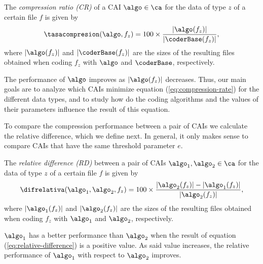 \vspace{+2pt}
\begin{defcion}
The \textit{compression ratio (CR)} of a CAI $\algo \in \ca$ for the data of type $z$ of a certain file $f$ is given by
\vspace{-5pt}
\begin{equation}
\label{eq:compression-rate}
\tasacompresion(\algo, f_z) = 100\times\frac{|\algo(f_z)|}{|\coderBase(f_z)|},
\end{equation}
where $|\algo(f_z)|$ and $|\coderBase(f_z)|$ are the sizes of the resulting files obtained when coding $f_z$ with $\algo$ and $\coderBase$, respectively.
\end{defcion}


The performance of $\algo$ improves as $|\algo(f_z)|$ decreases. Thus, our main goals are to analyze which CAIs minimize equation (\ref{eq:compression-rate}) for the different data types, and to study how do the coding algorithms and the values of their parameters influence the result of this equation.


To compare the compression performance between a pair of CAIs we calculate the relative difference, which we define next. In general, it only makes sense to compare CAIs that have the same threshold parameter $e$.


\vspace{+5pt}
\begin{defcion}
The \textit{relative difference (RD)} between a pair of CAIs $\algo_1, \algo_2 \in {\ca}$ for the data of type $z$ of a certain file $f$ is given by
\vspace{-5pt}
\begin{equation}
\label{eq:relative-difference}
\difrelativa(\algo_1, \algo_2, f_z)  =
100\times\frac{|\algo_2 (f_z)| - |\algo_1 (f_z)|}{ |\algo_2 (f_z)| },
\end{equation}
where $|\algo_1(f_z)|$ and $|\algo_2(f_z)|$ are the sizes of the resulting files obtained when coding $f_z$ with $\algo_1$ and $\algo_2$, respectively. 
\end{defcion}


$\algo_1$ has a better performance than $\algo_2$ when the result of equation (\ref{eq:relative-difference}) is a positive value. As said value increases, the relative performance of $\algo_1$ with respect to $\algo_2$ improves.
